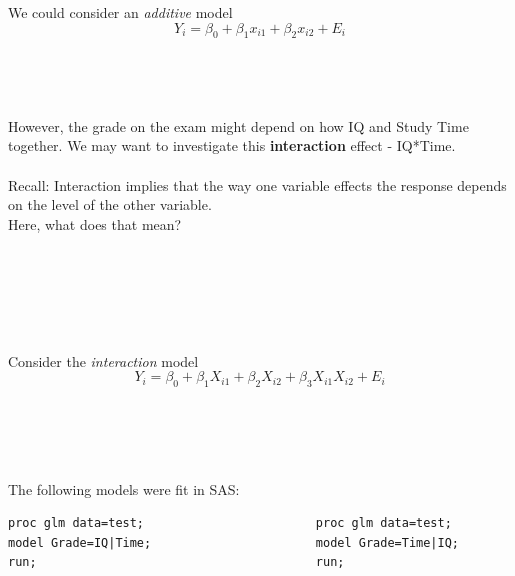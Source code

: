 We could consider an \textit{additive} model
$$Y_i=\beta_0+\beta_1x_{i1} +\beta_2x_{i2}+E_i$$~\\~\\~\\~\\
However, the grade on the exam might depend on how IQ and Study Time together. We may want to investigate this \textbf{interaction} effect - IQ*Time.\\~\\

Recall: Interaction implies that the way one variable effects the response depends on the level of the other variable.\\

Here, what does that mean?\\~\\~\\~\\~\\~\\~\\

Consider the \textit{interaction} model
$$Y_i=\beta_0+\beta_1X_{i1} +\beta_2X_{i2}+\beta_3X_{i1}X_{i2}+E_i$$~\\~\\~\\~\\

\newpage

The following models were fit in SAS:
\begin{small}
\begin{verbatim}
proc glm data=test;                        proc glm data=test;
model Grade=IQ|Time;                       model Grade=Time|IQ;
run;                                       run;
\end{verbatim}
\end{small}

